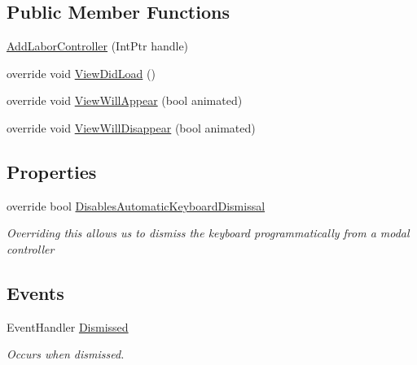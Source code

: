 \subsection*{Public Member Functions}
\begin{DoxyCompactItemize}
\item 
\hyperlink{class_field_service_1_1i_o_s_1_1_add_labor_controller_aa64ea24d9c6c0eb7da6530be27425b9e}{Add\+Labor\+Controller} (Int\+Ptr handle)
\item 
override void \hyperlink{class_field_service_1_1i_o_s_1_1_add_labor_controller_a963f6ea11e8c8141b94a2c3ee386a0e9}{View\+Did\+Load} ()
\item 
override void \hyperlink{class_field_service_1_1i_o_s_1_1_add_labor_controller_a687b3f8b35d6565d9aefb012096645aa}{View\+Will\+Appear} (bool animated)
\item 
override void \hyperlink{class_field_service_1_1i_o_s_1_1_add_labor_controller_aa50d974a66ef5b41c3733719995485fb}{View\+Will\+Disappear} (bool animated)
\end{DoxyCompactItemize}
\subsection*{Properties}
\begin{DoxyCompactItemize}
\item 
override bool \hyperlink{class_field_service_1_1i_o_s_1_1_add_labor_controller_a2211be478c0790650388b8394d2e37cd}{Disables\+Automatic\+Keyboard\+Dismissal}
\begin{DoxyCompactList}\small\item\em Overriding this allows us to dismiss the keyboard programmatically from a modal controller \end{DoxyCompactList}\end{DoxyCompactItemize}
\subsection*{Events}
\begin{DoxyCompactItemize}
\item 
Event\+Handler \hyperlink{class_field_service_1_1i_o_s_1_1_add_labor_controller_acdd338bdb7162e462d1b4317b9a0cf6d}{Dismissed}
\begin{DoxyCompactList}\small\item\em Occurs when dismissed. \end{DoxyCompactList}\end{DoxyCompactItemize}
